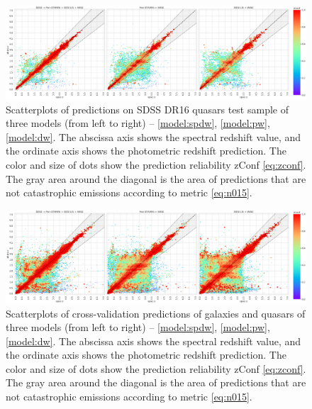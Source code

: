 \documentclass[fleqn,usenatbib]{mnras}
\begin{document}
\begin{figure}
    \centering
    \includegraphics[width=0.99\linewidth]{images/scatterplots-dr16q-wo-train-sorted.png}
    \caption{Scatterplots of predictions on SDSS DR16 quasars test sample of three models (from left to right) -- \ref{model:spdw}, \ref{model:pw}, \ref{model:dw}. The abscissa axis shows the spectral redshift value, and the ordinate axis shows the photometric redshift prediction. The color and size of dots show the prediction reliability zConf \eqref{eq:zconf}. The gray area around the diagonal is the area of predictions that are not catastrophic emissions according to metric \eqref{eq:n015}.}
    \label{fig:scatter-dr16q_wo_train}
\end{figure}


\begin{figure}
    \centering
    \includegraphics[width=0.99\linewidth]{images/scatterplots-cv2-total-sorted.png}
    \caption{Scatterplots of cross-validation predictions of galaxies and quasars of three models (from left to right) -- \ref{model:spdw}, \ref{model:pw}, \ref{model:dw}. The abscissa axis shows the spectral redshift value, and the ordinate axis shows the photometric redshift prediction. The color and size of dots show the prediction reliability zConf \eqref{eq:zconf}. The gray area around the diagonal is the area of predictions that are not catastrophic emissions according to metric \eqref{eq:n015}.}
    \label{fig:scatter-cv2-total}
\end{figure}
\end{document}
